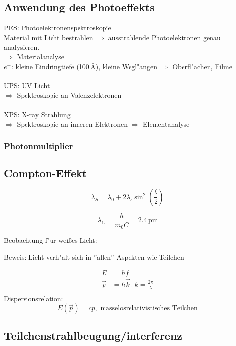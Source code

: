\subsection{Anwendung des Photoeffekts}

PES: Photoelektronenspektroskopie\\
Material mit Licht bestrahlen $\Rightarrow$ ausstrahlende Photoelektronen genau analysieren.
\\
$\Rightarrow$ Materialanalyse\\
$e^-$: kleine Eindringtiefe (100\,\AA), kleine Wegl"angen $\Rightarrow$ Oberfl"achen, Filme\\
\\
UPS: UV Licht\\
$\Rightarrow$ Spektroskopie an Valenzelektronen\\
\\
XPS: X-ray Strahlung\\
$\Rightarrow$ Spektroskopie an inneren Elektronen $\Rightarrow$ Elementanalyse

\subsubsection{Photonmultiplier}

\subsection{Compton-Effekt}

\[\lambda_S=\lambda_0+2\lambda_c\sin^2\left(\frac{\theta}{2}\right)\]

\[\lambda_C=\frac{h}{m_0C}=2.4\,\mathrm{pm}\]

Beobachtung f"ur wei\ss es Licht:
\\
\begin{arrowlist}
\item Beweis: Licht verh"alt sich in ''allen'' Aspekten wie Teilchen
\item \begin{align*}
E&=hf\\
\vec{p}&=\hbar\vec{k},\ k=\frac{2\pi}{\lambda}\\
\end{align*}
Dispersionsrelation: \[E(\vec{p})=cp,\textrm{ masselosrelativistisches Teilchen}\]
\end{arrowlist}

\subsection{Teilchenstrahlbeugung/interferenz}

